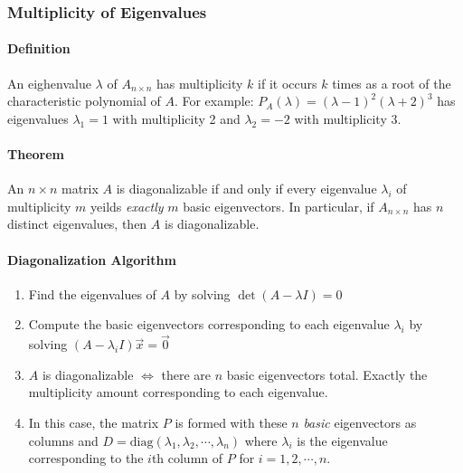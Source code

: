 \subsubsection*{Multiplicity of Eigenvalues}
\paragraph*{Definition}
An eighenvalue $\lambda$ of $A_{n \times n}$ has multiplicity $k$ if it occurs $k$ times as a root of the characteristic polynomial of $A$.
For example: $P_A(\lambda) = (\lambda - 1)^2(\lambda + 2)^3$ has eigenvalues $\lambda_1 = 1$ with multiplicity 2 and $\lambda_2 = -2$ with multiplicity 3.

\paragraph*{Theorem}
An $n \times n$ matrix $A$ is diagonalizable if and only if every eigenvalue $\lambda_i$ of multiplicity $m$ yeilds \emph{exactly} $m$ basic eigenvectors.
In particular, if $A_{n \times n}$ has $n$ distinct eigenvalues, then $A$ is diagonalizable.


\paragraph*{Diagonalization Algorithm}
\begin{enumerate}
    \item Find the eigenvalues of $A$ by solving $\det(A - \lambda I) = 0$
    \item Compute the basic eigenvectors corresponding to each eigenvalue $\lambda_i$ by solving $(A - \lambda_i I)\vec{x} = \vec{0}$
    \item $A$ is diagonalizable $\iff$ there are $n$ basic eigenvectors total. Exactly the multiplicity amount corresponding to each eigenvalue.
    \item In this case, the matrix $P$ is formed with these $n$ \emph{basic} eigenvectors as columns and $D = \text{diag}(\lambda_1, \lambda_2, \cdots, \lambda_n)$ where $\lambda_i$ is the eigenvalue corresponding to the $i$th column of $P$ for $i = 1, 2, \cdots, n$.
\end{enumerate}


